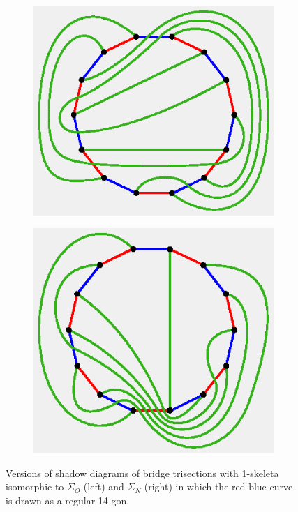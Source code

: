 \documentclass[11pt, oneside]{amsart}
\theoremstyle{theorem}
\theoremstyle{definition}
\theoremstyle{theorem}
\begin{document}
\begin{figure}[h!]
\begin{subfigure}{.5\textwidth}
  \centering
  \includegraphics[width=.7\linewidth]{hbtfinal.eps}
  \label{ofinal}
\end{subfigure}%
\begin{subfigure}{.5\textwidth}
  \centering
  \includegraphics[width=.7\linewidth]{nonbtfinal.eps}
  \label{nfinal}
\end{subfigure}
\caption{Versions of shadow diagrams of bridge trisections with 1-skeleta isomorphic to $\Sigma_O$ (left) and $\Sigma_N$ (right) in which the red-blue curve is drawn as a regular 14-gon.}
\label{final}
\end{figure}











\end{document}
